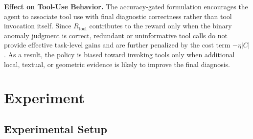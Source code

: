 \documentclass{article}
\begin{document}


\textbf{Effect on Tool-Use Behavior.}
The accuracy-gated formulation encourages the agent to associate tool use with final diagnostic correctness rather than tool invocation itself. 
Since $R_{\text{tool}}$ contributes to the reward only when the binary anomaly judgment is correct, redundant or uninformative tool calls do not provide effective task-level gains and are further penalized by the cost term $-\eta |C|$. 
As a result, the policy is biased toward invoking tools only when additional local, textual, or geometric evidence is likely to improve the final diagnosis.


\section{Experiment}


\subsection{Experimental Setup}
\label{sec:experiments_setup}
\end{document}

